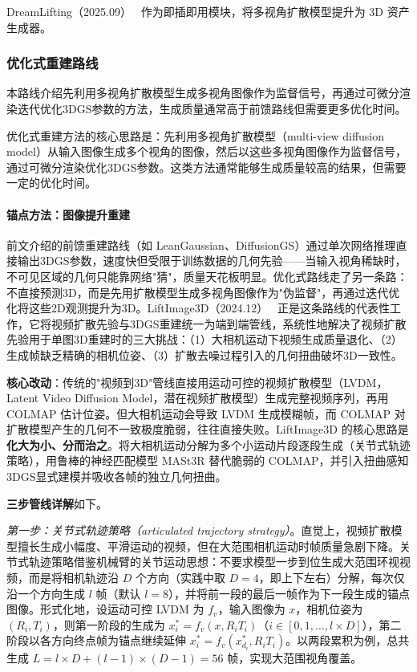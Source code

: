DreamLifting（2025.09）~\cite{2509_07435} 作为即插即用模块，将多视角扩散模型提升为 3D 资产生成器。

\subsubsection{优化式重建路线}
\label{sec:08_2_1_2}

本路线介绍先利用多视角扩散模型生成多视角图像作为监督信号，再通过可微分渲染迭代优化3DGS参数的方法，生成质量通常高于前馈路线但需要更多优化时间。

优化式重建方法的核心思路是：先利用多视角扩散模型（multi-view diffusion model）从输入图像生成多个视角的图像，然后以这些多视角图像作为监督信号，通过可微分渲染优化3DGS参数。这类方法通常能够生成质量较高的结果，但需要一定的优化时间。

\paragraph{锚点方法：图像提升重建}

前文介绍的前馈重建路线（如 LeanGaussian、DiffusionGS）通过单次网络推理直接输出3DGS参数，速度快但受限于训练数据的几何先验——当输入视角稀缺时，不可见区域的几何只能靠网络"猜"，质量天花板明显。优化式路线走了另一条路：不直接预测3D，而是先用扩散模型生成多视角图像作为"伪监督"，再通过迭代优化将这些2D观测提升为3D。LiftImage3D（2024.12）~\cite{2412_09597} 正是这条路线的代表性工作，它将视频扩散先验与3DGS重建统一为端到端管线，系统性地解决了视频扩散先验用于单图3D重建时的三大挑战：（1）大相机运动下视频生成质量退化、（2）生成帧缺乏精确的相机位姿、（3）扩散去噪过程引入的几何扭曲破坏3D一致性。

\textbf{核心改动}：传统的"视频到3D"管线直接用运动可控的视频扩散模型（LVDM，Latent Video Diffusion Model，潜在视频扩散模型）生成完整视频序列，再用 COLMAP 估计位姿。但大相机运动会导致 LVDM 生成模糊帧，而 COLMAP 对扩散模型产生的几何不一致极度脆弱，往往直接失败。LiftImage3D 的核心思路是\textbf{化大为小、分而治之}。将大相机运动分解为多个小运动片段逐段生成（关节式轨迹策略），用鲁棒的神经匹配模型 MASt3R 替代脆弱的 COLMAP，并引入扭曲感知3DGS显式建模并吸收各帧的独立几何扭曲。

\textbf{三步管线详解}如下。

\textit{第一步：关节式轨迹策略（articulated trajectory strategy）}。直觉上，视频扩散模型擅长生成小幅度、平滑运动的视频，但在大范围相机运动时帧质量急剧下降。关节式轨迹策略借鉴机械臂的关节运动思想：不要求模型一步到位生成大范围环视视频，而是将相机轨迹沿 $D$ 个方向（实践中取 $D=4$，即上下左右）分解，每次仅沿一个方向生成 $l$ 帧（默认 $l=8$），并将前一段的最后一帧作为下一段生成的锚点图像。形式化地，设运动可控 LVDM 为 $f_v$，输入图像为 $x$，相机位姿为 $(R_i, T_i)$，则第一阶段的生成为 $x_i^* = f_v(x, R_i T_i)$（$i \in [0, 1, \ldots, l \times D]$），第二阶段以各方向终点帧为锚点继续延伸 $x_{i}^* = f_v(x_{d_i}^*, R_i T_i)$。以两段累积为例，总共生成 $L = l \times D + (l-1) \times (D-1) = 56$ 帧，实现大范围视角覆盖。

